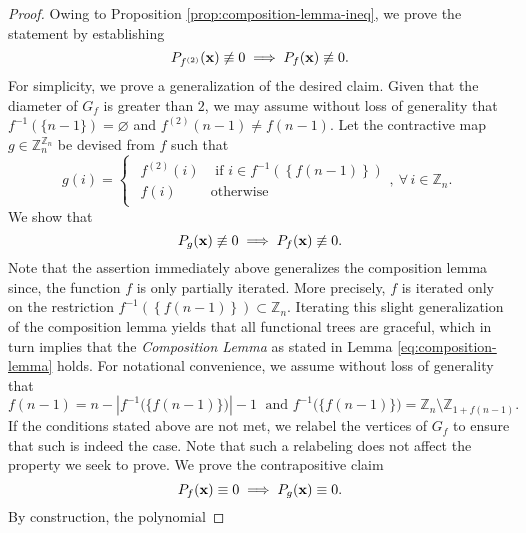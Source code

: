 \begin{proof}
Owing to Proposition \ref{prop:composition-lemma-ineq}, we prove the statement by establishing 
\[
    P_{f^{(2)}} ({\bf x}) \not\equiv 0  \implies  P_{f} ({\bf x}) \not\equiv 0.
\]
For simplicity, we prove a generalization of the desired claim. Given
that the diameter of $G_{f}$ is greater than $2$, we may assume
without loss of generality that $f^{-1}\left(\{n-1\}\right)=\varnothing$
and $f^{(2)}(n-1)\ne f(n-1)$. Let the contractive
map $g\in\mathbb{Z}_{n}^{\mathbb{Z}_{n}}$ be devised from $f$ such
that 
\begin{equation}
g\left(i\right)=\begin{cases}
\begin{array}{cc}
f^{\left(2\right)}\left(i\right) & \text{ if }i\in f^{-1}\left(\left\{ f\left(n-1\right)\right\} \right)\\
f\left(i\right) & \text{otherwise}
\end{array},\ \forall\,i\in\mathbb{Z}_{n}.\end{cases}
\end{equation}
We show that
\begin{equation} \label{eq:composition-lemma-generalized}
P_{g} ({\bf x}) \not\equiv 0  \implies  P_{f} ({\bf x}) \not\equiv 0.
\end{equation}
Note that the assertion immediately above generalizes the composition
lemma since, the function $f$ is only partially
iterated. More precisely, $f$ is iterated only on the restriction
$f^{-1}\left(\left\{ f\left(n-1\right)\right\} \right)\subset\mathbb{Z}_{n}$.
Iterating this slight generalization of the composition lemma yields
that all functional trees are graceful, which in turn implies that the \textit{Composition Lemma} as stated in Lemma \ref{eq:composition-lemma}  holds. For notational convenience,
we assume without loss of generality that 
\begin{equation}
f(n-1)=n-\left|f^{-1}\big(\{f(n-1)\}\big)\right|-1 \;\text{ and } f^{-1}\big(\{f(n-1)\}\big)=\mathbb{Z}_{n}\setminus\mathbb{Z}_{1+f(n-1)}.
\end{equation}
If the conditions stated above are not met, we relabel the vertices of $G_f$ to ensure that such is indeed the case. Note that such a relabeling does not affect the property we seek to prove. We prove the contrapositive claim
\begin{equation}\label{eq:contrapositive}
    P_{f}({\bf x})\equiv0\implies P_{g}({\bf x})\equiv0.
\end{equation}
By construction, the polynomial

\end{proof}
